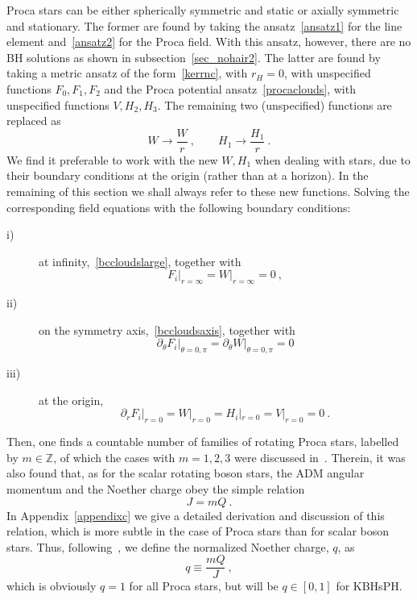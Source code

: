 \documentclass{article}
\numberwithin{equation}{section}
\begin{document}
Proca stars can be either spherically symmetric and static or axially symmetric and stationary. The former are found by taking the ansatz~\eqref{ansatz1} for the line element and~\eqref{ansatz2} for the Proca field. With this ansatz, however, there are no BH solutions as shown in subsection~\ref{sec_nohair2}. The latter are found by taking a metric ansatz of the form~\eqref{kerrnc}, with $r_H=0$, with unspecified functions $F_0,F_1,F_2$ and the Proca potential ansatz~\eqref{procaclouds}, with unspecified functions $V,H_2,H_3$.  The remaining two (unspecified) functions are replaced as
\begin{equation}
W\rightarrow \frac{{W}}{r} \ , \qquad H_1\rightarrow \frac{{H_1}}{r} \ . 
\label{ww}
\end{equation}
We find it preferable to work with the new ${W},{H_1}$ when dealing with stars, due to their boundary conditions at the origin (rather than at a horizon). In the remaining of this section we shall always refer to these new functions. Solving the corresponding field equations with the following boundary conditions:
\begin{description}
\item[i)] at infinity,~\eqref{bccloudslarge}, together with
\begin{equation}
F_i\big|_{r=\infty}={W}\big|_{r=\infty}=0 \ , 
\label{bcstarslarge}
\end{equation}
\item[ii)] on the symmetry axis,~\eqref{bccloudsaxis}, together with 
\begin{equation}
 \partial_\theta F_i\big|_{\theta=0,\pi}=\partial_\theta {W}\big|_{\theta=0,\pi}=0
 \label{bcstarsaxis}
 \end{equation}
 \item[iii)] at the origin, 
 \begin{equation}
 \partial_r F_i\big|_{r=0}={W}\big|_{r=0}=H_i|_{r=0}=V|_{r=0}=0 \ .
 \end{equation}
\end{description} 
 Then, one finds a countable number of families of rotating Proca stars, labelled by $m\in \mathbb{Z}$, of which the cases with $m=1,2,3$ were discussed in~\cite{Brito:2015pxa}.  Therein, it was also found that, as for the scalar rotating boson stars, the ADM angular momentum and the Noether charge obey the simple relation 
 \begin{equation}
 J=mQ \ .
\label{amnc}
 \end{equation}
%
In Appendix~\ref{appendixc} we give a detailed derivation and discussion of this relation, which is more subtle in the case of Proca stars than for scalar boson stars.  Thus, following~\cite{Herdeiro:2014goa}, we define the normalized Noether charge, $q$, as 
 \begin{equation}
 q\equiv \frac{mQ}{J} \ ,
 \label{jq}
 \end{equation}
 which is obviously $q=1$ for all Proca stars, but will be $q\in [0,1]$ for KBHsPH.
 
\end{document}
